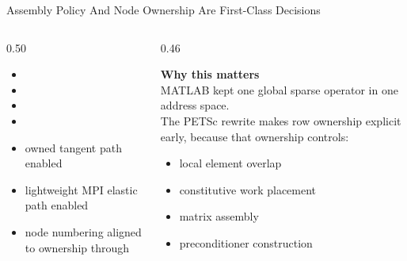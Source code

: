\documentclass[aspectratio=169,10pt]{beamer}
\begin{document}
\begin{frame}{Assembly Policy And Node Ownership Are First-Class Decisions}
\small
\begin{columns}[T,totalwidth=\textwidth]
\begin{column}{0.50\textwidth}
\begin{softbox}
\begin{itemize}
  \item {}
  \item {}
  \item {}
  \item {}
\end{itemize}
\begin{itemize}
  \item owned tangent path enabled
  \item lightweight MPI elastic path enabled
  \item node numbering aligned to ownership through 
\end{itemize}
\end{softbox}
\end{column}
\begin{column}{0.46\textwidth}
\begin{callout}
\textbf{Why this matters}\\[0.12cm]
MATLAB kept one global sparse operator in one address space.\\[0.18cm]
The PETSc rewrite makes row ownership explicit early, because that ownership controls:
\begin{itemize}
  \item local element overlap
  \item constitutive work placement
  \item matrix assembly
  \item preconditioner construction
\end{itemize}
\end{callout}
\end{column}
\end{columns}
\end{frame}
\end{document}
